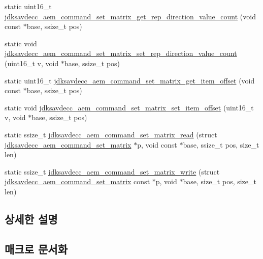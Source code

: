 \begin{DoxyCompactItemize}
\item 
static uint16\+\_\+t \hyperlink{group__command__set__matrix_gaf29492eae72d4e81e6bb4207c7b7666a}{jdksavdecc\+\_\+aem\+\_\+command\+\_\+set\+\_\+matrix\+\_\+get\+\_\+rep\+\_\+direction\+\_\+value\+\_\+count} (void const $\ast$base, ssize\+\_\+t pos)
\item 
static void \hyperlink{group__command__set__matrix_ga4124ae7b0d8518fb92dd5f8643e2ce7d}{jdksavdecc\+\_\+aem\+\_\+command\+\_\+set\+\_\+matrix\+\_\+set\+\_\+rep\+\_\+direction\+\_\+value\+\_\+count} (uint16\+\_\+t v, void $\ast$base, ssize\+\_\+t pos)
\item 
static uint16\+\_\+t \hyperlink{group__command__set__matrix_gaa2cf14d5f5d7ee2358b56a482922c85e}{jdksavdecc\+\_\+aem\+\_\+command\+\_\+set\+\_\+matrix\+\_\+get\+\_\+item\+\_\+offset} (void const $\ast$base, ssize\+\_\+t pos)
\item 
static void \hyperlink{group__command__set__matrix_ga8022b799a7b6fb35924a778f95166582}{jdksavdecc\+\_\+aem\+\_\+command\+\_\+set\+\_\+matrix\+\_\+set\+\_\+item\+\_\+offset} (uint16\+\_\+t v, void $\ast$base, ssize\+\_\+t pos)
\item 
static ssize\+\_\+t \hyperlink{group__command__set__matrix_gaecf800fea2d2e40ba127534645ea30bb}{jdksavdecc\+\_\+aem\+\_\+command\+\_\+set\+\_\+matrix\+\_\+read} (struct \hyperlink{structjdksavdecc__aem__command__set__matrix}{jdksavdecc\+\_\+aem\+\_\+command\+\_\+set\+\_\+matrix} $\ast$p, void const $\ast$base, ssize\+\_\+t pos, size\+\_\+t len)
\item 
static ssize\+\_\+t \hyperlink{group__command__set__matrix_gab9728a1288d8e2a0c297ca9b43624ca8}{jdksavdecc\+\_\+aem\+\_\+command\+\_\+set\+\_\+matrix\+\_\+write} (struct \hyperlink{structjdksavdecc__aem__command__set__matrix}{jdksavdecc\+\_\+aem\+\_\+command\+\_\+set\+\_\+matrix} const $\ast$p, void $\ast$base, size\+\_\+t pos, size\+\_\+t len)
\end{DoxyCompactItemize}


\subsection{상세한 설명}


\subsection{매크로 문서화}
